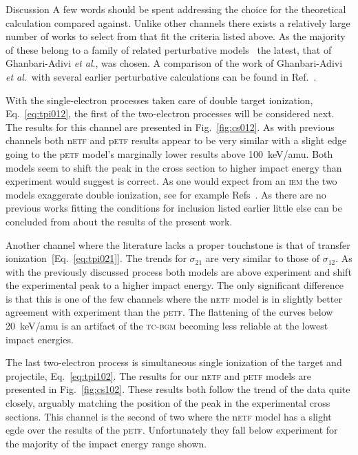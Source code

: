 \documentclass[aps, pra, reprint, groupedaddress, amsfonts, longbibliography,
               amsmath, amssymb, showpacs, nofootinbib]{revtex4-1}
\begin{document}
\begin{section}{Discussion \label{sec:disc}}
   A few words should be spent addressing the choice for the theoretical calculation compared against.
   Unlike other channels there exists a relatively large number of works to select from that fit the
   criteria listed above. As the majority of these belong to a family of related perturbative
   models~\cite{Mancev96, BOC05, Mancev-07, MG-10, NTC11, GG-12b, GAG15} the latest, that of
   Ghanbari-Adivi \textit{et al}., was chosen. A comparison of the work of Ghanbari-Adivi
   \textit{et al}.\ with several earlier perturbative calculations can be found in Ref.~\cite{GAG15}.

   With the single-electron processes taken care of double target ionization, Eq.~\eqref{eq:tpi012},
   the first of the two-electron processes will be considered next. The results for this channel are
   presented in Fig.~\ref{fig:cs012}. As with previous channels both n\textsc{etf} and p\textsc{etf}
   results appear to be very similar with a slight edge going to the p\textsc{etf} model's marginally
   lower results above 100~keV/amu. Both models seem to shift the peak in the cross section to higher
   impact energy than experiment would suggest is correct. As one would expect from an \textsc{iem}
   the two models exaggerate double ionization, see for example Refs~\cite{pbarhe-rev, p-he2p-he}. As
   there are no previous works fitting the conditions for inclusion listed earlier little else can be
   concluded from about the results of the present work.

   Another channel where the literature lacks a proper touchstone is that of transfer ionization\
   [Eq.~\eqref{eq:tpi021}]. The trends for $\sigma_{21}$ are very similar to those of $\sigma_{12}$.
   As with the previously discussed process both models are above experiment and shift the experimental
   peak to a higher impact energy. The only significant difference is that this is one of the few
   channels where the n\textsc{etf} model is in slightly better agreement with experiment than the
   p\textsc{etf}. The flattening of the curves below 20~keV/amu is an artifact of the \textsc{tc-bgm}
   becoming less reliable at the lowest impact energies.

   The last two-electron process is simultaneous single ionization of the target and projectile,
   Eq.~\eqref{eq:tpi102}. The results for our n\textsc{etf} and p\textsc{etf} models are presented in
   Fig.~\ref{fig:cs102}. These results both follow the trend of the data quite closely, arguably
   matching the position of the peak in the experimental cross sections. This channel is the second of
   two where the n\textsc{etf} model has a slight egde over the results of the p\textsc{etf}.
   Unfortunately they fall below experiment for the majority of the impact energy range shown.


\end{section}
\end{document}
